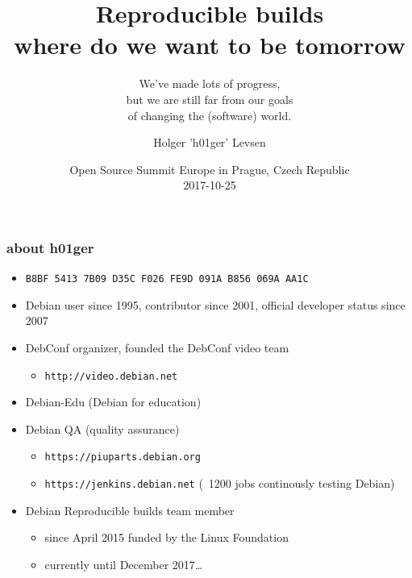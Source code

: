 \documentclass[14pt,aspectratio=169]{beamer}
\title[Reproducible Builds tomorrow]{Reproducible
builds \\ where do we want to be tomorrow}
\subtitle{We've made lots of progress, \\
but we are still far from our goals \\
of changing the (software) world.}
\author[h01ger]{%
   \texorpdfstring{
            \centering
            Holger 'h01ger' Levsen
   }{h01ger}}
\date[OSSE]{%
 Open Source Summit Europe in Prague, Czech Republic\\
 \small{2017-10-25}}
\newif\ifplacelogo
\begin{document}
\placelogofalse

\begin{frame}[plain]
 \titlepage
\end{frame}

\placelogotrue

\begin{frame}
 \frametitle{about h01ger}

 \begin{itemize}
  \item \small{\texttt{B8BF 5413 7B09 D35C F026  FE9D 091A B856 069A AA1C}}
  \item Debian user since 1995, contributor since 2001, official developer
  status since 2007
  \item DebConf organizer,
  founded the DebConf video team
   \begin{itemize}
    \item \texttt{http://video.debian.net}
   \end{itemize}
 \item Debian-Edu (Debian for education)
  \item Debian QA (quality assurance)
  \begin{itemize}
   \item \texttt{https://piuparts.debian.org}
   \item \texttt{https://jenkins.debian.net} (~1200 jobs continously testing Debian)
  \end{itemize}
  \item Debian Reproducible builds team member
  \begin{itemize}
   \item since April 2015 funded by the Linux Foundation
   \item currently until December 2017…
 \end{itemize}
 \end{itemize}
\end{frame}
\end{document}
